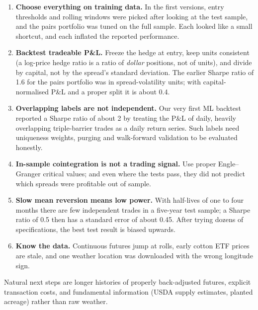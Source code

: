 \documentclass[11pt,a4paper]{article}
\begin{document}
\begin{enumerate}
\item \textbf{Choose everything on training data.} In the first versions, entry thresholds and rolling windows were
picked after looking at the test sample, and the pairs portfolio was tuned on the full sample. Each looked like a
small shortcut, and each inflated the reported performance.
\item \textbf{Backtest tradeable P\&L.} Freeze the hedge at entry, keep units consistent (a log-price hedge ratio is
a ratio of \emph{dollar} positions, not of units), and divide by capital, not by the spread's standard deviation. The
earlier Sharpe ratio of 1.6 for the pairs portfolio was in spread-volatility units; with capital-normalised P\&L
and a proper split it is about 0.4.
\item \textbf{Overlapping labels are not independent.} Our very first ML backtest reported a Sharpe ratio of about 2 by
treating the P\&L of daily, heavily overlapping triple-barrier trades as a daily return series. Such labels need
uniqueness weights, purging and walk-forward validation to be evaluated honestly.
\item \textbf{In-sample cointegration is not a trading signal.} Use proper Engle--Granger critical values; and even
where the tests pass, they did not predict which spreads were profitable out of sample.
\item \textbf{Slow mean reversion means low power.} With half-lives of one to four months there are few independent
trades in a five-year test sample; a Sharpe ratio of 0.5 then has a standard error of about 0.45. After trying dozens of
specifications, the best test result is biased upwards.
\item \textbf{Know the data.} Continuous futures jump at rolls, early cotton ETF prices are stale, and one weather
location was downloaded with the wrong longitude sign.
\end{enumerate}
Natural next steps are longer histories of properly back-adjusted futures, explicit transaction costs, and
fundamental information (USDA supply estimates, planted acreage) rather than raw weather.


{\small }
\end{document}
